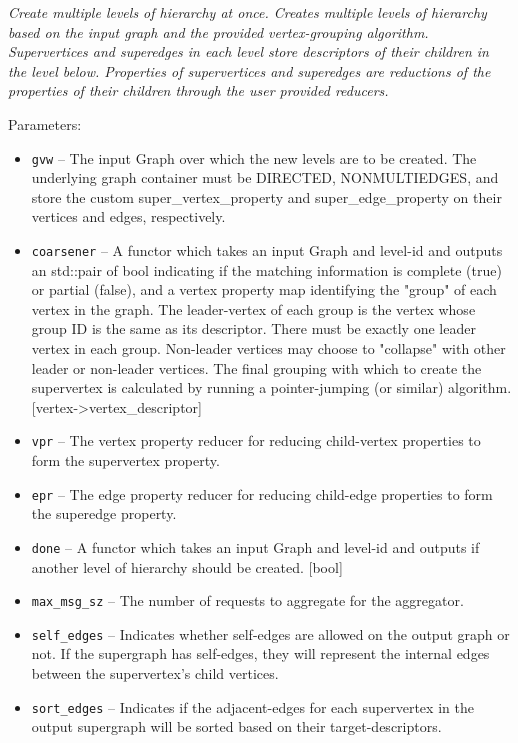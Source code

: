 \textit{
Create multiple levels of hierarchy at once.  Creates multiple levels of hierarchy based on the input graph and the provided vertex-grouping algorithm. Supervertices and superedges in each level store descriptors of their children in the level below. Properties of supervertices and superedges are reductions of the properties of their children through the user provided reducers.
}
\vspace{0.4cm}

Parameters:
\begin{itemize}
\item
\texttt{gvw} --
The input Graph over which the new levels are to be created. The underlying graph container must be DIRECTED, NONMULTIEDGES, and store the custom super\_vertex\_property and super\_edge\_property on their vertices and edges, respectively.
\item
\texttt{coarsener} --
A functor which takes an input Graph and level-id and outputs an std::pair of bool indicating if the matching information is complete (true) or partial (false), and a vertex property map identifying the "group" of each vertex in the graph. The leader-vertex of each group is the vertex whose group ID is the same as its descriptor. There must be exactly one leader vertex in each group. Non-leader vertices may choose to "collapse" with other leader or non-leader vertices. The final grouping with which to create the supervertex is calculated by running a pointer-jumping (or similar) algorithm. [vertex->vertex\_descriptor]
\item
\texttt{vpr} --
The vertex property reducer for reducing child-vertex properties to form the supervertex property.
\item
\texttt{epr} --
The edge property reducer for reducing child-edge properties to form the superedge property.
\item
\texttt{done} --
A functor which takes an input Graph and level-id and outputs if another level of hierarchy should be created. [bool]
\item
\texttt{max\_msg\_sz} --
The number of requests to aggregate for the aggregator.
\item
\texttt{self\_edges} --
Indicates whether self-edges are allowed on the output graph or not. If the supergraph has self-edges, they will represent the internal edges between the supervertex's child vertices.
\item
\texttt{sort\_edges} --
Indicates if the adjacent-edges for each supervertex in the output supergraph will be sorted based on their target-descriptors.
\end{itemize}

